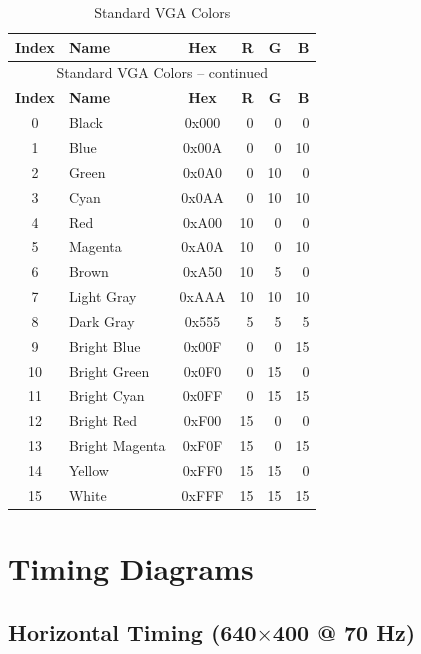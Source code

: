 \documentclass[11pt,letterpaper]{report}
\begin{document}
\begin{longtable}{clcrrr}
\caption{Standard VGA Colors}
\label{tab:vga_colors} \\
\toprule
\textbf{Index} & \textbf{Name} & \textbf{Hex} & \textbf{R} & \textbf{G} & \textbf{B} \\
\midrule
\endfirsthead

\multicolumn{6}{c}{Standard VGA Colors -- continued} \\
\toprule
\textbf{Index} & \textbf{Name} & \textbf{Hex} & \textbf{R} & \textbf{G} & \textbf{B} \\
\midrule
\endhead

\bottomrule
\endfoot

\bottomrule
\endlastfoot

0 & Black & 0x000 & 0 & 0 & 0 \\
1 & Blue & 0x00A & 0 & 0 & 10 \\
2 & Green & 0x0A0 & 0 & 10 & 0 \\
3 & Cyan & 0x0AA & 0 & 10 & 10 \\
4 & Red & 0xA00 & 10 & 0 & 0 \\
5 & Magenta & 0xA0A & 10 & 0 & 10 \\
6 & Brown & 0xA50 & 10 & 5 & 0 \\
7 & Light Gray & 0xAAA & 10 & 10 & 10 \\
8 & Dark Gray & 0x555 & 5 & 5 & 5 \\
9 & Bright Blue & 0x00F & 0 & 0 & 15 \\
10 & Bright Green & 0x0F0 & 0 & 15 & 0 \\
11 & Bright Cyan & 0x0FF & 0 & 15 & 15 \\
12 & Bright Red & 0xF00 & 15 & 0 & 0 \\
13 & Bright Magenta & 0xF0F & 15 & 0 & 15 \\
14 & Yellow & 0xFF0 & 15 & 15 & 0 \\
15 & White & 0xFFF & 15 & 15 & 15 \\
\end{longtable}

\section{Timing Diagrams}

\subsection{Horizontal Timing (640$\times$400 @ 70 Hz)}
\end{document}
